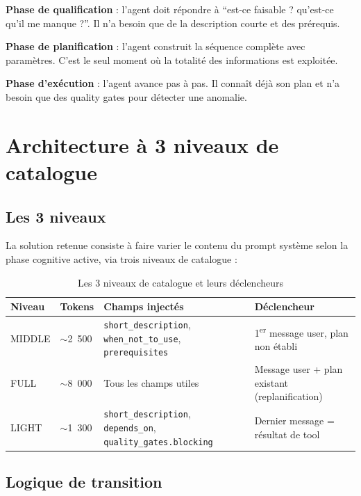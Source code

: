 \documentclass[12pt, a4paper]{article}
\begin{document}
\begin{infobox}
\textbf{Phase de qualification} : l'agent doit répondre à ``est-ce faisable ? qu'est-ce qu'il me manque ?''. Il n'a besoin que de la description courte
et des prérequis.

\textbf{Phase de planification} : l'agent construit la séquence complète avec
paramètres. C'est le seul moment où la totalité des informations est exploitée.

\textbf{Phase d'exécution} : l'agent avance pas à pas. Il connaît déjà son plan
et n'a besoin que des quality gates pour détecter une anomalie.
\end{infobox}

\section{Architecture à 3 niveaux de catalogue}

\subsection{Les 3 niveaux}

La solution retenue consiste à faire varier le contenu du prompt système selon
la phase cognitive active, via trois niveaux de catalogue :

\begin{table}[h]
\centering
\begin{tabularx}{\textwidth}{llXl}
\toprule
Niveau & Tokens & Champs injectés & Déclencheur\\
\midrule
MIDDLE & $\sim$2~500 & \texttt{short\_description}, \texttt{when\_not\_to\_use},
  \texttt{prerequisites} & 1\textsuperscript{er} message user, plan non établi\\
FULL & $\sim$8~000 & Tous les champs utiles & Message user + plan existant (replanification)\\
LIGHT & $\sim$1~300 & \texttt{short\_description}, \texttt{depends\_on},
  \texttt{quality\_gates.blocking} & Dernier message = résultat de tool\\
\bottomrule
\end{tabularx}
\caption{Les 3 niveaux de catalogue et leurs déclencheurs}
\end{table}

\subsection{Logique de transition}
\end{document}
